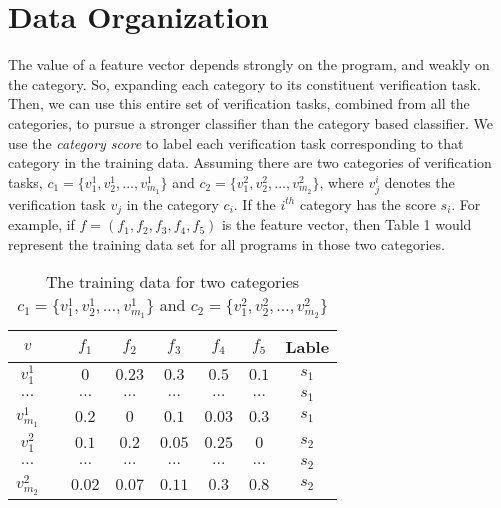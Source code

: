 \section{Data Organization}
\label{data}
The value of a feature vector depends strongly on the program, and weakly on the category. So, expanding each category to its constituent verification task. Then, we can use this entire set of verification tasks, combined from all the categories, to pursue a stronger classifier than the category based classifier. We use the \emph{category score} to label each verification task corresponding to that category in the training data. Assuming there are two categories of verification tasks, $c_1=\{v^1_1, v^1_2, ..., v^1_{m_1}\}$ and $c_2=\{v^2_1, v^2_2, ..., v^2_{m_2}\}$, where $v^i_j$ denotes the verification task $v_j$ in the category $c_i$. If the $i^{th}$ category has the score $s_i$. For example, if $f=(f_1, f_2, f_3, f_4, f_5)$ is the feature vector, then Table 1 would represent the training data set for all programs in those two categories. 
\begin{table}
\label{tbl:training_data}
\centering
\begin{tabular}{ccc|c|c|c|c||c}
$v$ & & $f_1$ & $f_2$ &  $f_3$ & $f_4$ & $f_5$ & Lable \\
\hline
$v^1_1$ & & $0$ & $0.23$ &  $0.3$ & $0.5$ & $0.1$ & $s_1$ \\
$\dots$ & & $\dots$ & $\dots$ &  $\dots$ & $\dots$ & $\dots$ & $s_1$ \\
$v^1_{m_1}$ & & $0.2$ & $0$ &  $0.1$ & $0.03$ & $0.3$ & $s_1$ \\
$v^2_{1}$ & & $0.1$ & $0.2$ &  $0.05$ & $0.25$ & $0$ & $s_2$ \\
$\dots$ & & $\dots$ & $\dots$ &  $\dots$ & $\dots$ & $\dots$ & $s_2$ \\
$v^2_{m_2}$ & & $0.02$ & $0.07$ &  $0.11$ & $0.3$ & $0.8$ & $s_2$ \\
\end{tabular}
\caption{The training data for two categories $c_1=\{v^1_1, v^1_2, ..., v^1_{m_1}\}$ and $c_2=\{v^2_1, v^2_2, ..., v^2_{m_2}\}$}
\end{table}
